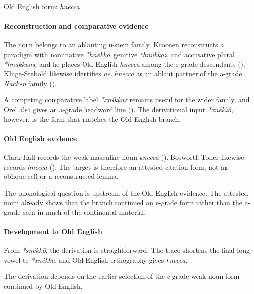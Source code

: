 \documentclass[
  british,
  a4paper,
]{article}
\begin{document}
Old English form: \emph{hnecca}

\paragraph{Reconstruction and comparative
evidence}\label{reconstruction-and-comparative-evidence-20}

The noun belongs to an ablauting n-stem family. Kroonen reconstructs a
paradigm with nominative \emph{*hnekkō}, genitive \emph{*hnukkaz}, and
accusative plural \emph{*hnakkuns}, and he places Old English
\emph{hnecca} among the e-grade descendants
(). Kluge-Seebold likewise
identifies \emph{ae. hnecca} as an ablaut partner of the a-grade
\emph{Nacken} family ().

A competing comparative label \emph{*xnákkaz} remains useful for the
wider family, and Orel also gives an a-grade headword line
(). The derivational input
\emph{*xnékkô}, however, is the form that matches the Old English
branch.

\paragraph{Old English evidence}\label{old-english-evidence-20}

Clark Hall records the weak masculine noun \emph{hnecca}
(). Bosworth-Toller
likewise records \emph{hnecca}
(). The
target is therefore an attested citation form, not an oblique cell or a
reconstructed lemma.

The phonological question is upstream of the Old English evidence. The
attested noun already shows that the branch continued an e-grade form
rather than the a-grade seen in much of the continental material.

\paragraph{Development to Old
English}\label{development-to-old-english-20}

From \emph{*xnékkô}, the derivation is straightforward. The trace
shortens the final long vowel to \emph{*xnékka}, and Old English
orthography gives \emph{hnecca}.

The derivation depends on the earlier selection of the e-grade weak-noun
form continued by Old English.
\end{document}

